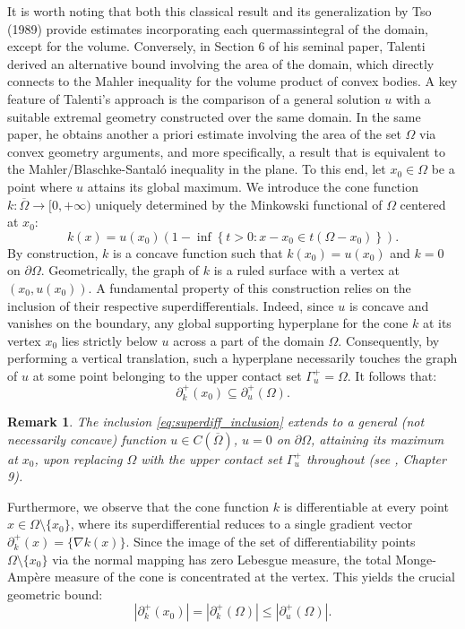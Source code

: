 \documentclass{article}
\newtheorem{remark}[theorem]{Remark}
\numberwithin{equation}{section}
\begin{document}
\vspace{1em}
\noindent It is worth noting that both this classical result and its generalization by Tso (1989) provide estimates incorporating each quermassintegral of the domain, except for the volume. Conversely, in Section 6 of his seminal paper, Talenti derived an alternative bound involving the area of the domain, which directly connects to the Mahler inequality for the volume product of convex bodies. A key feature of Talenti's approach is the comparison of a general solution $u$ with a suitable extremal geometry constructed over the same domain. In the same paper, he obtains another a priori estimate involving the area of the set $\Omega$ via convex geometry arguments, and more specifically, a result that is equivalent to the Mahler/Blaschke-Santaló inequality in the plane. To this end, let $x_0 \in \Omega$ be a point where $u$ attains its global maximum. We introduce the cone function $k: \overline{\Omega} \to [0, +\infty)$ uniquely determined by the Minkowski functional of $\Omega$ centered at $x_0$:
\begin{equation}\label{eq:cone_definition}
k(x) = u(x_0) \left( 1 - \inf\left\{ t > 0 : x - x_0 \in t(\Omega - x_0) \right\} \right).
\end{equation}
By construction, $k$ is a concave function such that $k(x_0) = u(x_0)$ and $k = 0$ on $\partial\Omega$. Geometrically, the graph of $k$ is a ruled surface with a vertex at $(x_0, u(x_0))$. A fundamental property of this construction relies on the inclusion of their respective superdifferentials. Indeed, since $u$ is concave and vanishes on the boundary, any global supporting hyperplane for the cone $k$ at its vertex $x_0$ lies strictly below $u$ across a part of the domain $\Omega$. Consequently, by performing a vertical translation, such a hyperplane necessarily touches the graph of $u$ at some point belonging to the upper contact set $\Gamma_u^+ = \Omega$. It follows that:
\begin{equation}\label{eq:superdiff_inclusion}
\partial^+_k(x_0) \subseteq \partial^+_u(\Omega).
\end{equation}
\begin{remark}\label{rem:general-u}
The inclusion \eqref{eq:superdiff_inclusion} extends to a general (not necessarily concave) function $u\in C(\overline\Omega)$, $u=0$ on $\partial\Omega$, attaining its maximum at $x_0$, upon replacing $\Omega$ with the upper contact set $\Gamma_u^+$ throughout (see \cite{gilbarg2001}, Chapter 9).
\end{remark}
\noindent Furthermore, we observe that the cone function $k$ is differentiable at every point $x \in \Omega \setminus \{x_0\}$, where its superdifferential reduces to a single gradient vector $\partial^+_k(x) = \{\nabla k(x)\}$. Since the image of the set of differentiability points $\Omega \setminus \{x_0\}$ via the normal mapping has zero Lebesgue measure, the total Monge-Ampère measure of the cone is concentrated at the vertex. This yields the crucial geometric bound:
\begin{equation}\label{eq:measure_bound_cone}
|\partial^+_k(x_0)| = |\partial^+_k(\Omega)| \leq |\partial^+_u(\Omega)|.
\end{equation}
\end{document}
